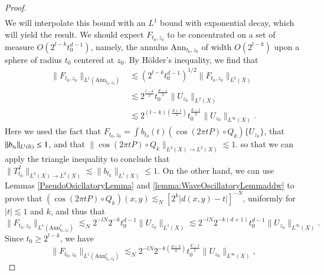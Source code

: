 \begin{proof}
\begin{equation}
\begin{split}
    \end{split}
    \end{equation}
    We will interpolate this bound with an $L^1$ bound with exponential decay, which will yield the result. We should expect $F_{t_0,z_0}$ to be concentrated on a set of measure $O( 2^{l-k} t_0^{d-1} )$, namely, the annulus $\text{Ann}_{t_0,z_0}$ of width $O(2^{l-k})$ upon a sphere of radius $t_0$ centered at $z_0$. By H\"{o}lder's inequality, we find that
    \begin{equation}
    \begin{split}
        \| F_{t_0,z_0} \|_{L^1(\text{Ann}_{t_0,z_0})} &\lesssim \left( 2^{l-k} t_0^{d-1} \right)^{1/2} \| F_{t_0,z_0} \|_{L^2(X)}\\
        &\lesssim 2^{\frac{l-k}{2}} t_0^{\frac{d-1}{2}} \| U_{z_0} \|_{L^2(X)}\\
        &\lesssim 2^{(l-k) \left( \frac{d+1}{2}\right)} t_0^{\frac{d-1}{2}} \| U_{z_0} \|_{L^\infty(X)}.
    \end{split}
    \end{equation}
    Here we used the fact that $F_{t_0,z_0} = \int b_{t_0}(t) ( \cos(2 \pi t P) \circ Q_k ) \{ U_{z_0} \}$, that $\| b_{t_0} \|_{L^1(\operatorname{\mathbb{R}})} \leq 1$,  and that $\| \cos(2 \pi t P) \circ Q_k \|_{L^2(X) \to L^2(X)} \lesssim 1$. so that we can apply the triangle inequality to conclude that $\| T_{t_0}^I \|_{L^2(X) \to L^2(X)} \lesssim \| b_{t_0} \|_{L^1(X)} \leq 1$. On the other hand, we can use Lemmas \ref{PseudoOsicllatoryLemma} and \ref{lemma:WaveOscillatoryLemmaddw} to prove that $(\cos(2 \pi t P) \circ Q_k)(x,y) \lesssim_N [2^k |d(x,y) - t|]^{-N}$, uniformly for $|t| \lesssim 1$ and $k$, and thus that
    \begin{equation}
        \| F_{t_0,z_0} \|_{L^1(\text{Ann}_{t_0,z_0}^c)} \lesssim_N 2^{-lN} 2^{-k} t_0^{d-1} \| U_{z_0} \|_{L^1(X)} \lesssim 2^{-lN} 2^{-k(d+1)} t_0^{d-1} \| U_{z_0} \|_{L^\infty(X)}.
    \end{equation}
    Since $t_0 \geq 2^{l-k}$, we have
    \begin{equation}
        \| F_{t_0,z_0} \|_{L^1(\text{Ann}_{t_0,z_0}^c)} \lesssim_N 2^{-lN} 2^{-k \left( \frac{d+3}{2} \right)} t_0^{\frac{d-1}{2}} \| U_{z_0} \|_{L^\infty(X)},

\end{equation}
\end{proof}
